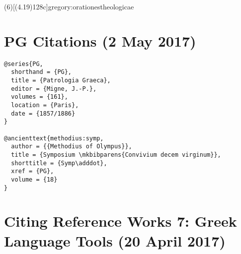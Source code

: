 \documentclass[a4paper]{article}
\begin{document}
\examplecite(6)[(4.19)128c]{gregory:orationestheologicae}
\exampleabbreviations
{}

\section{PG Citations (2 May 2017)}

\begin{verbatim}
@series{PG,
  shorthand = {PG},
  title = {Patrologia Graeca},
  editor = {Migne, J.-P.},
  volumes = {161},
  location = {Paris},
  date = {1857/1886}
}

@ancienttext{methodius:symp,
  author = {{Methodius of Olympus}},
  title = {Symposium \mkbibparens{Convivium decem virginum}},
  shorttitle = {Symp\adddot},
  xref = {PG},
  volume = {18}
}
\end{verbatim}

\exampleancientsources
\examplesecondarysources
{}

\section{Citing Reference Works 7: Greek Language Tools (20 April 2017)}
\end{document}
